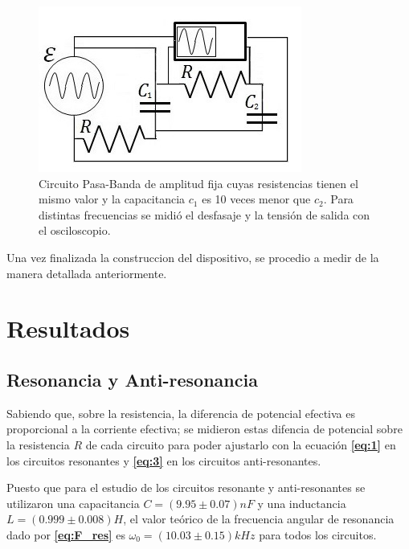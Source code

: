 \documentclass[11pt,a4paper]{article}
\begin{document}
\begin{figure}[h]
\centering
\includegraphics[scale=0.8]{Circuito-RC-Pasa-Banda}
  \caption{Circuito Pasa-Banda de amplitud fija cuyas resistencias tienen el mismo valor y la capacitancia $c_{1}$ es 10 veces menor que $c_{2}$. Para distintas frecuencias se midió el desfasaje y la tensión de salida con el osciloscopio.}
  \label{fig:RC-PBD}
\end{figure}

Una vez finalizada la construccion del dispositivo, se procedio a medir de la manera detallada anteriormente.



\section{Resultados}


\subsection{Resonancia y Anti-resonancia}

Sabiendo que, sobre la resistencia, la diferencia de potencial efectiva es proporcional a la corriente efectiva; se midieron estas difencia de potencial sobre la resistencia $R$ de cada circuito para poder ajustarlo con la ecuación \textbf{\eqref{eq:1}} en los circuitos resonantes y \textbf{\eqref{eq:3}} en los circuitos anti-resonantes.  

Puesto que para el estudio de los circuitos resonante y anti-resonantes se utilizaron una capacitancia $C= (9.95 \pm 0.07)nF$ y una inductancia $L= (0.999 \pm 0.008) H$, el valor teórico de la frecuencia angular de resonancia dado por \textbf{\eqref{eq:F_res}} es $\omega_{0}=(10.03 \pm 0.15) kHz$ para todos los circuitos.
\end{document}
